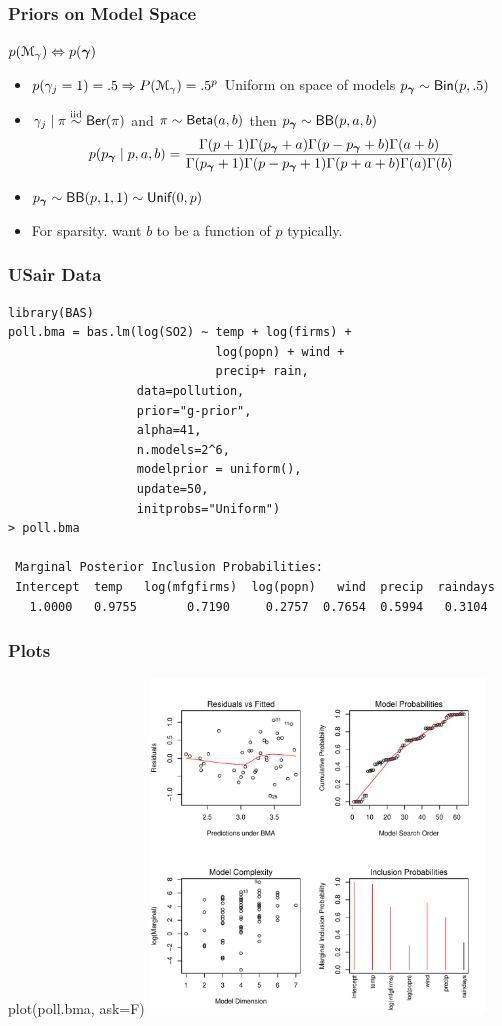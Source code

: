 \documentclass[]{beamer}
\begin{document}
\begin{frame}
  \frametitle{Priors on Model Space}
  $p({\cal M}_\gamma) \Leftrightarrow p(\boldsymbol{\gamma})$
  \begin{itemize}
  \item $p(\gamma_j = 1) = .5 \Rightarrow P({\cal M}_\gamma) = .5^p$  Uniform on space of models \pause $p_{\boldsymbol{\gamma}} \sim \textsf{Bin}(p, .5)$
\item $\gamma_j \mid \pi \mathrel{\mathop{\sim}\limits^{\rm iid}} \textsf{Ber}(\pi)$ and $\pi \sim \textsf{Beta}(a,b)$ then  $p_{\boldsymbol{\gamma}} \sim \textsf{BB}(p, a, b)$
$$
p(p_{\boldsymbol{\gamma}} \mid p, a, b) = \frac{ \Gamma(p + 1) \Gamma(p_{\boldsymbol{\gamma}} + a) \Gamma(p - p_{\boldsymbol{\gamma}} + b) \Gamma (a + b) }{\Gamma(p_{\boldsymbol{\gamma}}+1) \Gamma(p - p_{\boldsymbol{\gamma}} + 1) \Gamma(p + a + b) \Gamma(a) \Gamma(b)}
$$
\item $p_{\boldsymbol{\gamma}} \sim \textsf{BB}(p, 1, 1) \sim \textsf{Unif}(0, p)$
\item For sparsity. want $b$ to be a function of $p$ typically. 
  \end{itemize}
\end{frame}

\begin{frame}[fragile]
\frametitle{USair Data}
\begin{verbatim}
library(BAS)
poll.bma = bas.lm(log(SO2) ~ temp + log(firms) + 
                             log(popn) + wind + 
                             precip+ rain, 
                  data=pollution, 
                  prior="g-prior", 
                  alpha=41,
                  n.models=2^6, 
                  modelprior = uniform(),
                  update=50, 
                  initprobs="Uniform")
> poll.bma

 Marginal Posterior Inclusion Probabilities: 
 Intercept  temp   log(mfgfirms)  log(popn)   wind  precip  raindays
   1.0000   0.9755       0.7190     0.2757  0.7654  0.5994   0.3104  
\end{verbatim}
\end{frame}
\begin{frame}[fragile]\frametitle{Plots}
plot(poll.bma, ask=F)
  \centering 
  \includegraphics[height=3.5in]{poll-bma-sum}
\end{frame}
\end{document}
